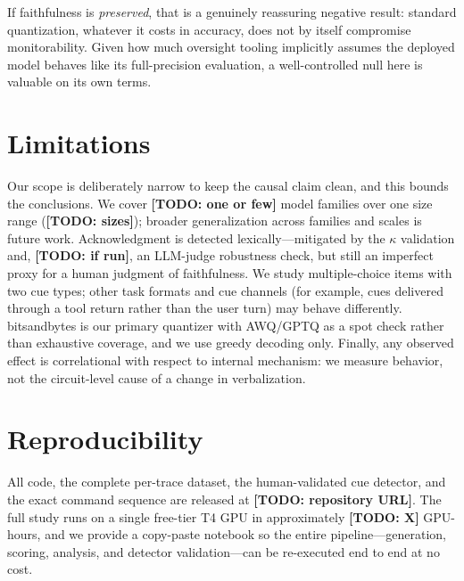 \documentclass[11pt]{article}
\newcommand{\todo}[1]{{\color{red}\textbf{[TODO: #1]}}}
\begin{document}
If faithfulness is \emph{preserved}, that is a genuinely reassuring negative
result: standard quantization, whatever it costs in accuracy, does not by itself
compromise monitorability. Given how much oversight tooling implicitly assumes
the deployed model behaves like its full-precision evaluation, a well-controlled
null here is valuable on its own terms.

\section{Limitations}
Our scope is deliberately narrow to keep the causal claim clean, and this bounds
the conclusions. We cover \todo{one or few} model families over one size range
(\todo{sizes}); broader generalization across families and scales is future work.
Acknowledgment is detected lexically---mitigated by the $\kappa$ validation and,
\todo{if run}, an LLM-judge robustness check, but still an imperfect proxy for a
human judgment of faithfulness. We study multiple-choice items with two cue
types; other task formats and cue channels (for example, cues delivered through a
tool return rather than the user turn) may behave differently. bitsandbytes is
our primary quantizer with AWQ/GPTQ as a spot check rather than exhaustive
coverage, and we use greedy decoding only. Finally, any observed effect is
correlational with respect to internal mechanism: we measure behavior, not the
circuit-level cause of a change in verbalization.

\section*{Reproducibility}
All code, the complete per-trace dataset, the human-validated cue detector, and
the exact command sequence are released at \todo{repository URL}. The full study
runs on a single free-tier T4 GPU in approximately \todo{X} GPU-hours, and we
provide a copy-paste notebook so the entire pipeline---generation, scoring,
analysis, and detector validation---can be re-executed end to end at no cost.



\end{document}
